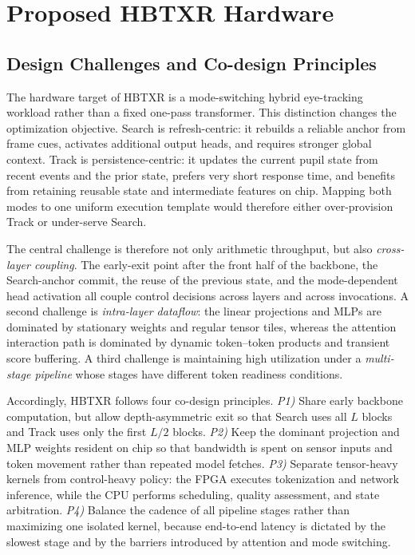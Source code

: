 \documentclass[journal]{IEEEtran}
\begin{document}
\section{Proposed HBTXR Hardware}

\subsection{Design Challenges and Co-design Principles}
The hardware target of HBTXR is a mode-switching hybrid eye-tracking workload rather than a fixed one-pass transformer. This distinction changes the optimization objective. Search is refresh-centric: it rebuilds a reliable anchor from frame cues, activates additional output heads, and requires stronger global context. Track is persistence-centric: it updates the current pupil state from recent events and the prior state, prefers very short response time, and benefits from retaining reusable state and intermediate features on chip. Mapping both modes to one uniform execution template would therefore either over-provision Track or under-serve Search.

The central challenge is therefore not only arithmetic throughput, but also \emph{cross-layer coupling}. The early-exit point after the front half of the backbone, the Search-anchor commit, the reuse of the previous state, and the mode-dependent head activation all couple control decisions across layers and across invocations. A second challenge is \emph{intra-layer dataflow}: the linear projections and MLPs are dominated by stationary weights and regular tensor tiles, whereas the attention interaction path is dominated by dynamic token--token products and transient score buffering. A third challenge is maintaining high utilization under a \emph{multi-stage pipeline} whose stages have different token readiness conditions.

Accordingly, HBTXR follows four co-design principles. \emph{P1)} Share early backbone computation, but allow depth-asymmetric exit so that Search uses all $L$ blocks and Track uses only the first $L/2$ blocks. \emph{P2)} Keep the dominant projection and MLP weights resident on chip so that bandwidth is spent on sensor inputs and token movement rather than repeated model fetches. \emph{P3)} Separate tensor-heavy kernels from control-heavy policy: the FPGA executes tokenization and network inference, while the CPU performs scheduling, quality assessment, and state arbitration. \emph{P4)} Balance the cadence of all pipeline stages rather than maximizing one isolated kernel, because end-to-end latency is dictated by the slowest stage and by the barriers introduced by attention and mode switching.
\end{document}
